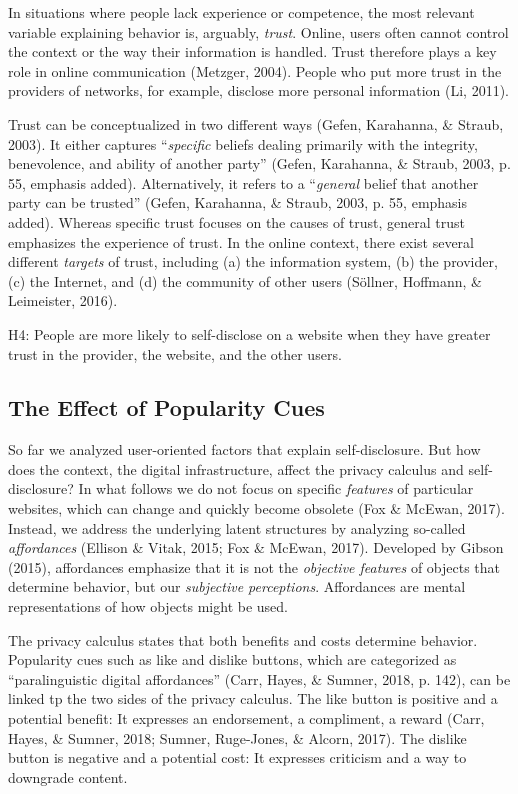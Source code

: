 \documentclass[
  english,
  man,floatsintext]{apa6}
\begin{document}
In situations where people lack experience or competence, the most relevant variable explaining behavior is, arguably, \emph{trust}.
Online, users often cannot control the context or the way their information is handled.
Trust therefore plays a key role in online communication (Metzger, 2004).
People who put more trust in the providers of networks, for example, disclose more personal information (Li, 2011).

Trust can be conceptualized in two different ways (Gefen, Karahanna, \& Straub, 2003).
It either captures ``\emph{specific} beliefs dealing primarily with the integrity, benevolence, and ability of another party'' (Gefen, Karahanna, \& Straub, 2003, p. 55, emphasis added).
Alternatively, it refers to a ``\emph{general} belief that another party can be trusted'' (Gefen, Karahanna, \& Straub, 2003, p. 55, emphasis added).
Whereas specific trust focuses on the causes of trust, general trust emphasizes the experience of trust.
In the online context, there exist several different \emph{targets} of trust, including (a) the information system, (b) the provider, (c) the Internet, and (d) the community of other users (Söllner, Hoffmann, \& Leimeister, 2016).

H4: People are more likely to self-disclose on a website when they have greater trust in the provider, the website, and the other users.

\hypertarget{the-effect-of-popularity-cues}{%
\subsection{The Effect of Popularity Cues}\label{the-effect-of-popularity-cues}}

So far we analyzed user-oriented factors that explain self-disclosure.
But how does the context, the digital infrastructure, affect the privacy calculus and self-disclosure?
In what follows we do not focus on specific \emph{features} of particular websites, which can change and quickly become obsolete (Fox \& McEwan, 2017).
Instead, we address the underlying latent structures by analyzing so-called \emph{affordances} (Ellison \& Vitak, 2015; Fox \& McEwan, 2017).
Developed by Gibson (2015), affordances emphasize that it is not the \emph{objective features} of objects that determine behavior, but our \emph{subjective perceptions}.
Affordances are mental representations of how objects might be used.

The privacy calculus states that both benefits and costs determine behavior.
Popularity cues such as like and dislike buttons, which are categorized as ``paralinguistic digital affordances'' (Carr, Hayes, \& Sumner, 2018, p. 142), can be linked tp the two sides of the privacy calculus.
The like button is positive and a potential benefit:
It expresses an endorsement, a compliment, a reward (Carr, Hayes, \& Sumner, 2018; Sumner, Ruge-Jones, \& Alcorn, 2017).
The dislike button is negative and a potential cost:
It expresses criticism and a way to downgrade content.
\end{document}

